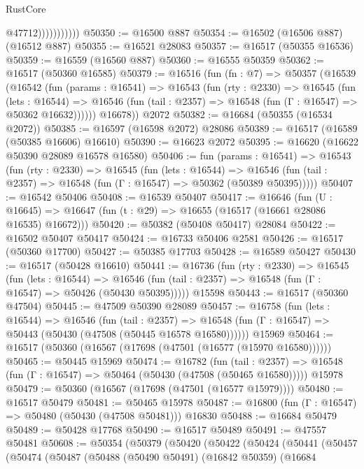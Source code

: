 \begin{lexlean}{RustCore}
\begin{coremodule}
                          @47712)))))))))))
@50350 := @16500 @887
@50354 := @16502 (@16506 @887) (@16512 @887)
@50355 := @16521 @28083
@50357 := @16517 (@50355 @16536)
@50359 := @16559 (@16560 @887)
@50360 := @16555 @50359
@50362 := @16517 (@50360 @16585)
@50379 := @16516
    (fun (fn : @7) =>
    @50357
      (@16539
        (@16542
          (fun (params : @16541) =>
          @16543
            (fun (rty : @2330) =>
            @16545
              (fun (lets : @16544) =>
              @16546 (fun (tail : @2357) => @16548 (fun (Γ : @16547) => @50362 @16632))))))
        @16678))
    @2072
@50382 := @16684 (@50355 (@16534 @2072))
@50385 := @16597 (@16598 @2072) @28086
@50389 := @16517 (@16589 (@50385 @16606) @16610)
@50390 := @16623 @2072
@50395 := @16620 (@16622 @50390 @28089 @16578 @16580)
@50406 := fun (params : @16541) =>
  @16543
    (fun (rty : @2330) =>
    @16545
      (fun (lets : @16544) =>
      @16546 (fun (tail : @2357) => @16548 (fun (Γ : @16547) => @50362 (@50389 @50395)))))
@50407 := @16542 @50406
@50408 := @16539 @50407
@50417 := @16646
    (fun (U : @16645) => @16647 (fun (t : @29) => @16655 (@16517 (@16661 @28086 @16535) @16672)))
@50420 := @50382 (@50408 @50417) @28084
@50422 := @16502 @50407 @50417
@50424 := @16733 @50406 @2581
@50426 := @16517 (@50360 @17700)
@50427 := @50385 @17703
@50428 := @16589 @50427
@50430 := @16517 (@50428 @16610)
@50441 := @16736
    (fun (rty : @2330) =>
    @16545
      (fun (lets : @16544) =>
      @16546 (fun (tail : @2357) => @16548 (fun (Γ : @16547) => @50426 (@50430 @50395)))))
    @15598
@50443 := @16517 (@50360 @47504)
@50445 := @47509 @50390 @28089
@50457 := @16758
    (fun (lets : @16544) =>
    @16546
      (fun (tail : @2357) =>
      @16548 (fun (Γ : @16547) => @50443 (@50430 (@47508 (@50445 @16578 @16580))))))
    @15969
@50464 := @16517 (@50360 (@16567 (@17698 (@47501 (@16577 (@15970 @16580))))))
@50465 := @50445 @15969
@50474 := @16782
    (fun (tail : @2357) => @16548 (fun (Γ : @16547) => @50464 (@50430 (@47508 (@50465 @16580)))))
    @15978
@50479 := @50360 (@16567 (@17698 (@47501 (@16577 @15979))))
@50480 := @16517 @50479
@50481 := @50465 @15978
@50487 := @16800 (fun (Γ : @16547) => @50480 (@50430 (@47508 @50481))) @16830
@50488 := @16684 @50479
@50489 := @50428 @17768
@50490 := @16517 @50489
@50491 := @47557 @50481
@50608 := @50354
    (@50379
      (@50420
        (@50422
          (@50424
            (@50441
              (@50457
                (@50474
                  (@50487
                    (@50488
                      (@50490 @50491)
                      (@16842 @50359)
                      (@16684

\end{coremodule}
\end{lexlean}
